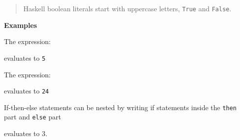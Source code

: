 \begin{quote}
Haskell boolean literals start with uppercase letters, \texttt{True} and
\texttt{False}.
\end{quote}

\textbf{Examples}

The expression:

\begin{Shaded}
\begin{Highlighting}[]
\NormalTok{ (} \OperatorTok{\textgreater{}} \NormalTok{) }   
\end{Highlighting}
\end{Shaded}

evaluates to \texttt{5}

The expression:

\begin{Shaded}
\begin{Highlighting}[]
 \OperatorTok{*}\NormalTok{ (}\NormalTok{ (} \OperatorTok{\textless{}=} \NormalTok{) }   \NormalTok{)}
\end{Highlighting}
\end{Shaded}

evaluates to \texttt{24}

If-then-else statements can be nested by writing if statements inside
the \texttt{then} part and \texttt{else} part

\begin{Shaded}
\begin{Highlighting}[]
\NormalTok{ (} \OperatorTok{\textgreater{}} \NormalTok{) }\NormalTok{ (}\NormalTok{ (} \OperatorTok{==} \NormalTok{) }  \NormalTok{ (} \OperatorTok{+} \NormalTok{)) }\NormalTok{ (}\NormalTok{ (} \OperatorTok{==} \NormalTok{) }  \NormalTok{ (}\NormalTok{ (} \OperatorTok{==} \NormalTok{) }   \NormalTok{))}
\end{Highlighting}
\end{Shaded}

evaluates to 3.

